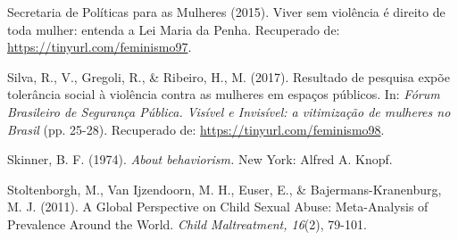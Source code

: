 \hangindent=25pt
\noindent Secretaria de Políticas para as Mulheres (2015). Viver sem violência é direito de toda mulher: entenda a Lei Maria da Penha. Recuperado de: \url{https://tinyurl.com/feminismo97}.

\hangindent=25pt
\noindent Silva, R., V., Gregoli, R., \& Ribeiro, H., M. (2017). Resultado de pesquisa expõe tolerância social à violência contra as mulheres em espaços públicos. In: \textit{Fórum Brasileiro de Segurança Pública. Visível e Invisível: a vitimização de mulheres no Brasil} (pp. 25-28). Recuperado de: \url{https://tinyurl.com/feminismo98}.

\hangindent=25pt
\noindent Skinner, B. F. (1974). \textit{About behaviorism.} New York: Alfred A. Knopf.

\hangindent=25pt
\noindent Stoltenborgh, M., Van Ijzendoorn, M. H., Euser, E., \& Bajermans-Kranenburg, M. J. (2011). A Global Perspective on Child Sexual Abuse: Meta-Analysis of Prevalence Around the World. \textit{Child Maltreatment, 16}(2), 79-101.
